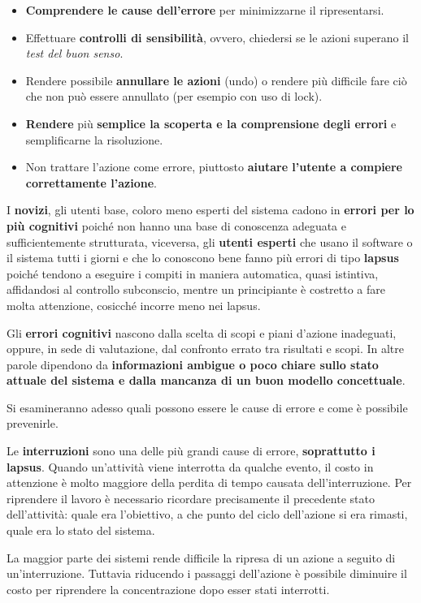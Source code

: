\documentclass[a4paper,11pt,oneside]{book}
\begin{document}
\begin{itemize}
	\item \textbf{Comprendere le cause dell'errore} per minimizzarne il ripresentarsi.
	\item Effettuare \textbf{controlli di sensibilità}, ovvero, chiedersi se le azioni superano il \textit{test del buon senso}.
	\item Rendere possibile \textbf{annullare le azioni} (undo) o rendere più difficile fare ciò che non può essere annullato (per esempio con uso di lock).
	\item \textbf{Rendere} più \textbf{semplice la scoperta e la comprensione degli errori} e semplificarne la risoluzione.
	\item Non trattare l'azione come errore, piuttosto \textbf{aiutare l'utente a compiere correttamente l'azione}.
\end{itemize}

I \textbf{novizi}, gli utenti base, coloro meno esperti del sistema cadono in \textbf{errori per lo più cognitivi} poiché non hanno una base di conoscenza adeguata e sufficientemente strutturata, viceversa, gli \textbf{utenti esperti} che usano il software o il sistema tutti i giorni e che lo conoscono bene fanno più errori di tipo \textbf{lapsus} poiché tendono a eseguire i compiti in maniera automatica, quasi istintiva, affidandosi al controllo subconscio, mentre un
principiante è costretto a fare molta attenzione, cosicché incorre meno nei lapsus.

Gli \textbf{errori cognitivi} nascono dalla scelta di scopi e piani d'azione inadeguati, oppure, in sede di valutazione, dal confronto errato tra risultati e scopi. In altre parole dipendono da \textbf{informazioni ambigue o poco chiare sullo stato attuale del sistema e dalla mancanza di un buon modello concettuale}.

Si esamineranno adesso quali possono essere le cause di errore e come è possibile prevenirle.

Le \textbf{interruzioni} sono una delle più grandi cause di errore, \textbf{soprattutto i lapsus}. Quando un'attività viene interrotta da qualche evento, il costo in attenzione è molto maggiore della perdita di tempo causata dell'interruzione. Per riprendere il lavoro è necessario ricordare precisamente il precedente stato dell'attività: quale era l'obiettivo, a che punto del ciclo dell'azione si era rimasti, quale era lo stato del sistema.

La maggior parte dei sistemi rende difficile la ripresa di un azione a seguito di un'interruzione. Tuttavia riducendo i passaggi dell'azione è possibile diminuire il costo per riprendere la concentrazione dopo esser stati interrotti.
\end{document}
